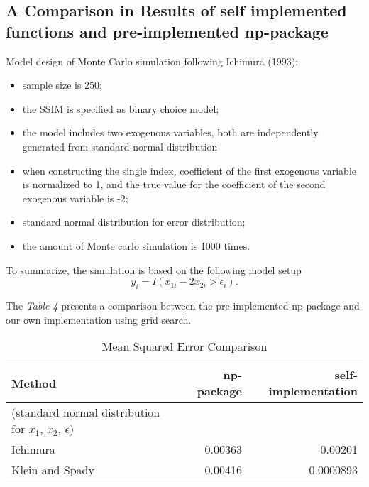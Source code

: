 \subsection{A Comparison in Results of self implemented functions and pre-implemented np-package}
Model design of Monte Carlo simulation following Ichimura (1993):
\begin{itemize}
\item sample size is 250;
\item the SSIM is specified as binary choice model;
\item the model includes two exogenous variables, both are independently generated from standard normal distribution  
\item when constructing the single index, coefficient of the first exogenous variable is normalized to 1, and the true value for the coefficient of the second exogenous variable is -2;
\item standard normal distribution for error distribution;
\item the amount of Monte carlo simulation is 1000 times.
\end{itemize}
To summarize, the simulation is based on the following model setup 
\begin{equation*}
y_i = I(x_{1i} - 2x_{2i} > \epsilon_i).
\end{equation*}

The \textit{Table 4} presents a comparison between the pre-implemented np-package and our own implementation using grid search.

\begin{table}[H]

\begin{tabular}{l r r}

\toprule
\textbf{Method} & \textbf{np-package} & \textbf{self-implementation} \tabularnewline\midrule
(standard normal distribution for $x_1$, $x_2$, $\epsilon$) & &
\tabularnewline
Ichimura & 0.00363 & 0.00201 \tabularnewline
Klein and Spady & 0.00416 & 0.0000893 \tabularnewline

\bottomrule
\end{tabular}
\caption {Mean Squared Error Comparison} \label{tab:mean squared error)
}

\end{table}

 


